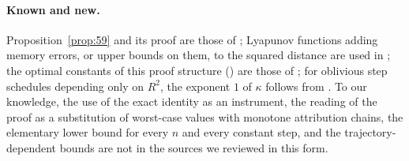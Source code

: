 \paragraph{Known and new.}
Proposition~\ref{prop:59} and its proof are those of \cite{bach2024learning}; Lyapunov functions adding memory errors, or upper
bounds on them, to the squared distance are used in \cite{hofmann2015variance,hu2017unified}; the optimal constants of
this proof structure () are those of \cite{hofmann2015variance}; for oblivious step schedules
depending only on $R^2$, the exponent $1$ of $\kappa$ follows from \cite[Theorem~2]{arjevani2016iteration}. To our
knowledge, the use of the exact identity as an instrument, the reading of the proof as a substitution of worst-case
values with monotone attribution chains, the elementary lower bound for every $n$ and every constant step, and the
trajectory-dependent bounds are not in the sources we reviewed in this form.
